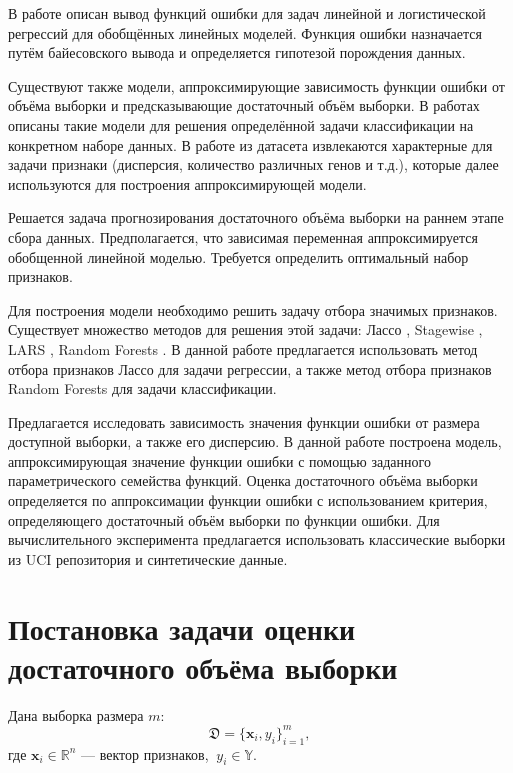 \documentclass[12pt, a4paper]{scrartcl}
\theoremstyle{plain}
\theoremstyle{definition}
\begin{document}
В работе \cite{Strijov-2012} описан вывод функций ошибки для задач линейной и логистической регрессий для обобщённых линейных моделей. Функция ошибки назначается путём байесовского вывода и определяется гипотезой порождения данных.

Существуют также модели, аппроксимирующие зависимость функции ошибки от объёма выборки и предсказывающие достаточный объём выборки.  В работах \cite{Figueroa-2012, Dobbin-2008} описаны такие модели для решения определённой задачи классификации на конкретном наборе данных. В работе \cite{Dobbin-2008} из датасета извлекаются характерные для задачи признаки (дисперсия, количество различных генов и т.д.), которые далее используются для построения аппроксимирующей модели. 

Решается задача прогнозирования достаточного объёма выборки на раннем этапе сбора данных.  Предполагается, что зависимая переменная аппроксимируется обобщенной линейной моделью. Требуется определить оптимальный набор признаков.

Для построения модели необходимо решить задачу отбора значимых признаков. Существует множество методов для решения этой задачи: Лассо \cite{Tibshirani-1996}, Stagewise \cite{Hastie-2007}, LARS \cite{Efron-2004}, Random Forests \cite{Brieman-2001}. В данной работе предлагается использовать метод отбора признаков Лассо для задачи регрессии, а также метод отбора признаков Random Forests для задачи классификации. 

Предлагается исследовать зависимость значения функции ошибки от размера доступной выборки, а также его дисперсию. В данной работе построена модель, аппроксимирующая значение функции ошибки с помощью заданного параметрического семейства функций. Оценка достаточного объёма выборки определяется по аппроксимации функции ошибки с использованием критерия, определяющего достаточный объём выборки по функции ошибки. Для вычислительного эксперимента предлагается использовать классические выборки из UCI репозитория и синтетические данные.


\newpage
\section{Постановка задачи оценки достаточного объёма выборки}

Дана выборка размера $m$:
$$
\mathfrak D = \{\mathbf{x}_i, y_i\}_{i=1}^m,
$$
где $\textbf{x}_i \in \mathbb{R}^{n}$ --- вектор признаков, $~y_i \in \mathbb{Y}$.
\end{document}

